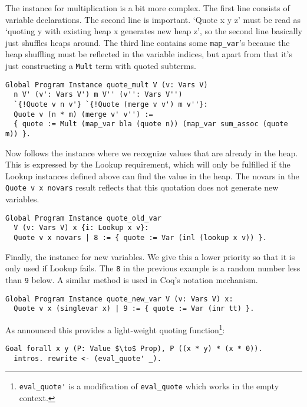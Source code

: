 \documentclass[a4paper,10pt,runningheads]{llncs}
\begin{document}
The instance for multiplication is a bit more complex. The first line consists of
 variable declarations. The second line is important. `Quote x y z' must be read as
 `quoting y with existing heap x generates new heap z', so the second line basically just
shuffles heaps around.
 The third line contains some \lstinline|map_var|'s because the heap shuffling must be
reflected in the variable indices, but apart from that it's just constructing a \lstinline|Mult| term with
quoted subterms.

\begin{lstlisting}
Global Program Instance quote_mult V (v: Vars V)
  n V' (v': Vars V') m V'' (v'': Vars V'')
  `{!Quote v n v'} `{!Quote (merge v v') m v''}:
  Quote v (n * m) (merge v' v'') :=
  { quote := Mult (map_var bla (quote n)) (map_var sum_assoc (quote m)) }.
\end{lstlisting}

  Now follows the instance where we recognize values that are already in the heap. This
   is expressed by the Lookup requirement, which will only be fulfilled if the Lookup instances
   defined above can find the value in the heap. The novars in the \lstinline|Quote v x novars| result
   reflects that this quotation does not generate new variables.

\begin{lstlisting}
Global Program Instance quote_old_var
  V (v: Vars V) x {i: Lookup x v}:
  Quote v x novars | 8 := { quote := Var (inl (lookup x v)) }.
\end{lstlisting}


\noindent Finally, the instance for new variables. We give this a lower priority so that it is only
used if Lookup fails. The \lstinline|8| in the previous example is a random number less than \lstinline|9| below. A similar method is used in Coq's notation mechanism.

\begin{lstlisting}
Global Program Instance quote_new_var V (v: Vars V) x:
  Quote v x (singlevar x) | 9 := { quote := Var (inr tt) }.
\end{lstlisting}


\noindent As announced this provides a light-weight quoting
function\footnote{\lstinline|eval_quote'| is a
modification of \lstinline|eval_quote| which works in the empty context.}:
\begin{lstlisting}
Goal forall x y (P: Value $\to$ Prop), P ((x * y) * (x * 0)).
  intros. rewrite <- (eval_quote' _).
\end{lstlisting}
\end{document}

